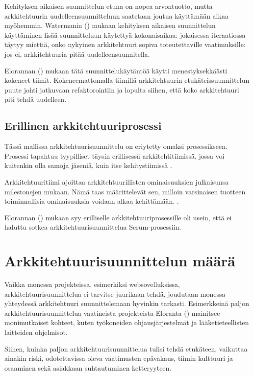 Kehityksen aikaisen suunnittelun etuna on nopea arvontuotto, mutta arkkitehtuurin uudelleensuunnitteluun saatetaan joutua käyttämään aikaa myöhemmin.
Watermanin (\citeyear{waterman_how_2015}) mukaan kehityksen aikaisen suunnittelun käyttäminen lisää suunnitteluun käytettyä kokonaisaikaa: jokaisessa iteraatiossa täytyy miettiä, onko nykyinen arkkitehtuuri sopiva toteutettaville vaatimuksille: jos ei, arkkitehtuuria pitää uudelleensuunnitella. 

Elorannan (\citeyear{eloranta2015techniques}) mukaan tätä suunnittelukäytäntöä käytti menestyksekkäästi kokeneet tiimit. Kokeneemattomalla tiimillä arkkitehtuurin etukäteissuunnittelun puute johti jatkuvaan refaktorointiin ja lopulta siihen, että koko arkkitehtuuri piti tehdä uudelleen.

\section{Erillinen arkkitehtuuriprosessi}
Tässä mallissa arkkitehtuurisuunnittelu on eriytetty omaksi prosessikseen. Prosessi tapahtuu tyypilliset täysin erillisessä arkkitehtitiimissä, jossa voi kuitenkin olla samoja jäseniä, kuin itse kehitystiimissä \citep{eloranta2015techniques}.

Arkkitehtuuritiimi ajoittaa arkkitehtuurillisten ominaisuuksien julkaisunsa milestonejen mukaan. Nämä taas määrittelevät sen, milloin varsinaisen tuotteen toiminnallisia ominaisuuksia voidaan alkaa kehittämään. \citep{eloranta2015techniques}.

Elorannan (\citeyear{eloranta2015techniques}) mukaan syy erilliselle arkkitehtuuriprosessille oli usein, että ei haluttu sotkea arkkitehtuurisuunnittelua Scrum-prosessiin.

\chapter{Arkkitehtuurisuunnittelun määrä}

Vaikka monessa projekteissa, esimerkiksi websovelluksissa, arkkitehtuurisuunnittelua ei tarvitse juurikaan tehdä, joudutaan monessa yhteydessä arkkitehtuuri suunnittelemaan hyvinkin tarkasti. Esimerkkeinä paljon arkkitehtuurisuunnittelua vaatineista projekteista Eloranta (\citeyear{eloranta2015techniques}) mainitsee monimutkaiset kohteet, kuten työkoneiden ohjausjärjestelmät ja lääketieteellisten laitteiden ohjelmisot.

Siihen, kuinka paljon arkkitehtuurisuunnittelua tulisi tehdä etukäteen, vaikuttaa ainakin riski, odotettavissa oleva vaatimusten epävakaus, tiimin kulttuuri ja osaaminen sekä asiakkaan suhtautuminen ketteryyteen.

